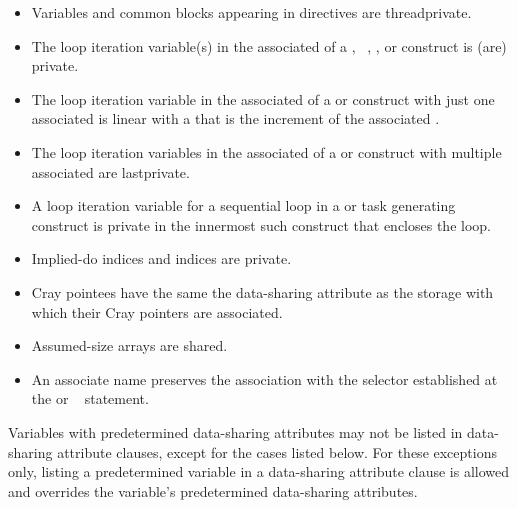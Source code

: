 \begin{fortranspecific}
\begin{itemize}
\item Variables and common blocks appearing in  directives are
threadprivate.

\item The loop iteration variable(s) in the associated  of a
  , ~,
, or  construct is (are) private.

\item The loop iteration variable in the associated  of a
   or   construct with just
one associated  is linear with a  that is the increment of
the associated .

\item The loop iteration variables in the associated  of a
 or  construct with multiple associated  are lastprivate.

\item A loop iteration variable for a sequential loop in a  or task generating construct is
private in the innermost such construct that encloses the loop.

\item Implied-do indices and  indices are private.

\item Cray pointees have the same the data-sharing attribute as the storage with which their Cray
pointers are associated.

\item Assumed-size arrays are shared.
\nopagebreak
\item An associate name preserves the association with the selector established at the
 or ~ statement.
\end{itemize}
\end{fortranspecific}
%
Variables with predetermined data-sharing attributes may not be listed in data-sharing
attribute clauses, except for the cases listed below. For these exceptions only, listing a
predetermined variable in a data-sharing attribute clause is allowed and overrides the
variable's predetermined data-sharing attributes.
%
